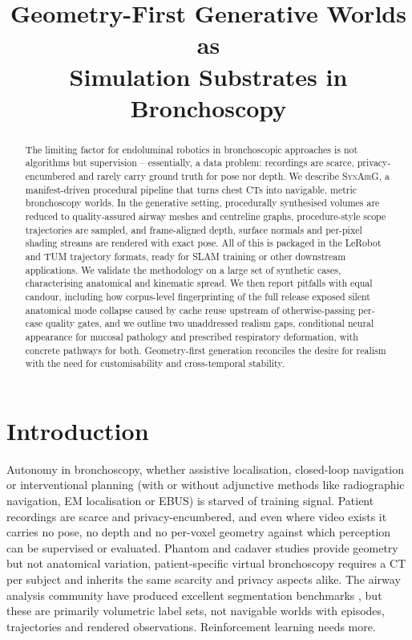 \documentclass[conference]{IEEEtran}
\newcommand{\synairg}{\textsc{SynAirG}}
\begin{document}
\title{Geometry-First Generative Worlds as\\Simulation Substrates in Bronchoscopy}

\author{
}

\maketitle

\begin{abstract}
The limiting factor for endoluminal robotics in bronchoscopic approaches is not algorithms but supervision -- essentially, a data problem: recordings are scarce, privacy-encumbered and rarely carry ground truth for pose nor depth. We describe \synairg{}, a manifest-driven procedural pipeline that turns chest CTs into navigable, metric bronchoscopy worlds. In the generative setting, procedurally synthesised volumes are reduced to quality-assured airway meshes and centreline graphs, procedure-style scope trajectories are sampled, and frame-aligned depth, surface normals and per-pixel shading streams are rendered with exact pose. All of this is packaged in the LeRobot and TUM trajectory formats, ready for SLAM training or other downstream applications. We validate the methodology on a large set of synthetic cases, characterising anatomical and kinematic spread. We then report pitfalls with equal candour, including how corpus-level fingerprinting of the full release exposed silent anatomical mode collapse caused by cache reuse upstream of otherwise-passing per-case quality gates, and we outline two unaddressed realism gaps, conditional neural appearance for mucosal pathology and prescribed respiratory deformation, with concrete pathways for both. Geometry-first generation reconciles the desire for realism with the need for customisability and cross-temporal stability.
\end{abstract}

\section{Introduction}
Autonomy in bronchoscopy, whether assistive localisation, closed-loop navigation or interventional planning (with or without adjunctive methods like radiographic navigation, EM localisation or EBUS) is starved of training signal. Patient recordings are scarce and privacy-encumbered, and even where video exists it carries no pose, no depth and no per-voxel geometry against which perception can be supervised or evaluated. Phantom and cadaver studies provide geometry but not anatomical variation, patient-specific virtual bronchoscopy \cite{kiraly2004} requires a CT per subject and inherits the same scarcity and privacy aspects alike. The airway analysis community have produced excellent segmentation benchmarks \cite{lo2012exact,zhang2023atm,stoverud2024aeropath}, but these are primarily volumetric label sets, not navigable worlds with episodes, trajectories and rendered observations. Reinforcement learning needs more.
\end{document}
